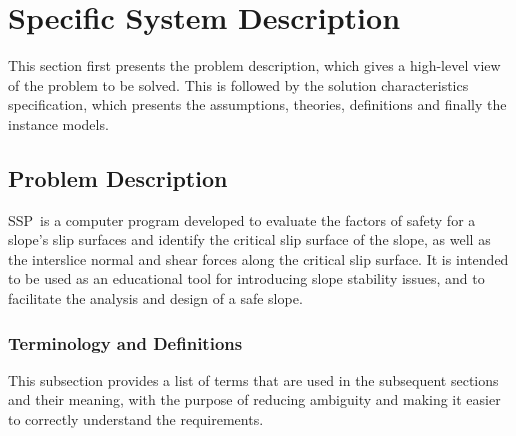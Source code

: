 \documentclass[12pt]{article}
\newcommand{\progname}{SSP}
\begin{document}
\section{Specific System Description}

This section first presents the problem description, which gives a
high-level view of the problem to be solved.  This is followed by the
solution characteristics specification, which presents the
assumptions, theories, definitions and finally the instance models.

\subsection{Problem Description} \label{Sec_pd}

\progname\ is a computer program developed to evaluate the factors of safety 
for a slope's slip surfaces and identify the critical slip surface of the 
slope, as well as the interslice normal and shear forces along the critical 
slip surface. It is intended to be used as an educational tool for introducing 
slope stability issues, and to facilitate the analysis and design of a safe 
slope.

\subsubsection{Terminology and Definitions}

This subsection provides a list of terms that are used in the subsequent
sections and their meaning, with the purpose of reducing ambiguity and
 making it easier to correctly understand the requirements.
\end{document}
